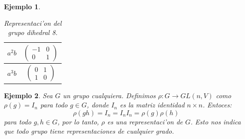 \documentclass[a4paper,openright,12pt]{report}
\numberwithin{equation}{section} %
\newtheorem{ejemplo}{Ejemplo}[section] %
\begin{document}
\begin{ejemplo}
\begin{table}[H]
\begin{center}
\begin{tabular}{|c|c|}
$a^{2}b$ & $\left( \begin{array}{cc}
-1 & 0  \\
0 & 1  \end{array} \right)$ \\ \hline
$a^{3}b$ & $\left( \begin{array}{cc}
0 & 1  \\
1 & 0  \end{array} \right)$ \\ \hline
\end{tabular}
\caption{Representaci'on del grupo dihedral 8.}
\label{tabla:dihedral8}
\end{center}
\end{table}
\end{ejemplo}
\begin{ejemplo}
Sea $G$ un grupo cualquiera. Definimos $\rho : G \rightarrow GL(n,V)$ como $\rho (g)=I_{n}$ para todo $g \in G$, donde $I_{n}$ es la matriz identidad $n \times n$. Entoces:
\[
\rho (gh) = I_{n}=I_{n}I_{n}=\rho (g)  \rho (h)
\]
para todo $g,h \in G$, por lo tanto, $\rho$ es una representaci'on de $G$. Esto nos indica que todo grupo tiene representaciones de cualquier grado.
\end{ejemplo}
\end{document}
